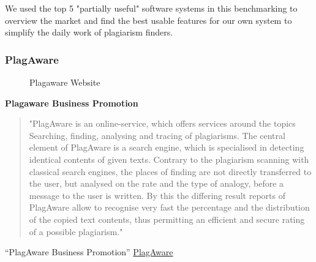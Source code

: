 We used the top 5 "partially useful" software systems in this  benchmarking to overview the market and find the best usable features for our own system to simplify the daily work of plagiarism finders. 
\newpage
\subsubsection{PlagAware} 
 \begin{figure}[!h]
  \centering
  \caption{Plagaware Website}
  \label{fig:plagawareWebsite}
\end{figure}


\textbf{Plagaware Business Promotion}
\begin{quote}
"PlagAware is an online-service, which offers services around the topics Searching, finding, analysing and tracing of plagiarisms. The central element of PlagAware is a search engine, which is specialised in detecting identical contents of given texts. Contrary to the plagiarism scanning with classical search engines, the places of finding are not directly transferred to the user, but analysed on the rate and the type of analogy, before a message to the user is written. By this the differing result reports of PlagAware allow to recognise very fast the percentage and the distribution of the copied text contents, thus permitting an efficient and secure rating of a possible plagiarism."  
\end{quote}
\enquote{PlagAware Business Promotion}\citep{PlagAware Website} \href{http://www.plagaware.de}{PlagAware}




